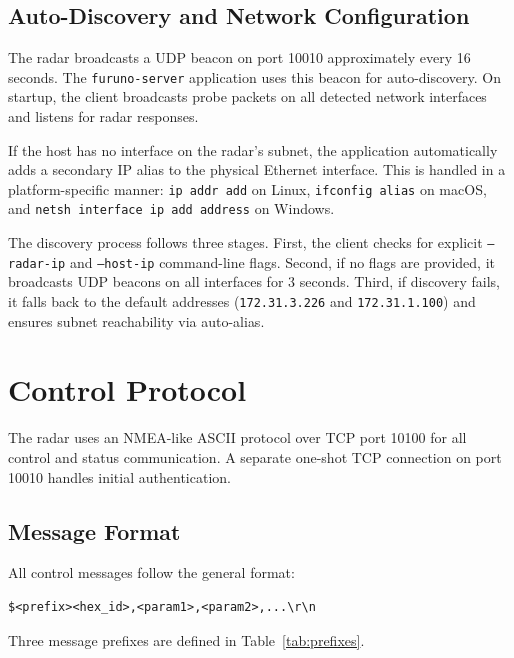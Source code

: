 \documentclass[11pt,letterpaper]{article}
\begin{document}
\subsection{Auto-Discovery and Network Configuration}

The radar broadcasts a UDP beacon on port 10010 approximately every 16 seconds. The \texttt{furuno-server} application uses this beacon for auto-discovery. On startup, the client broadcasts probe packets on all detected network interfaces and listens for radar responses.

If the host has no interface on the radar's subnet, the application automatically adds a secondary IP alias to the physical Ethernet interface. This is handled in a platform-specific manner: \texttt{ip addr add} on Linux, \texttt{ifconfig alias} on macOS, and \texttt{netsh interface ip add address} on Windows.

The discovery process follows three stages. First, the client checks for explicit \texttt{--radar-ip} and \texttt{--host-ip} command-line flags. Second, if no flags are provided, it broadcasts UDP beacons on all interfaces for 3 seconds. Third, if discovery fails, it falls back to the default addresses (\texttt{172.31.3.226} and \texttt{172.31.1.100}) and ensures subnet reachability via auto-alias.


\section{Control Protocol}

The radar uses an NMEA-like ASCII protocol over TCP port 10100 for all control and status communication. A separate one-shot TCP connection on port 10010 handles initial authentication.

\subsection{Message Format}

All control messages follow the general format:

\begin{lstlisting}
$<prefix><hex_id>,<param1>,<param2>,...\r\n
\end{lstlisting}

Three message prefixes are defined in Table~\ref{tab:prefixes}.
\end{document}
